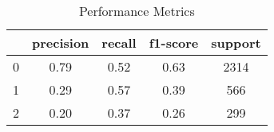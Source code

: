 \begin{table}[!ht]
    \centering
    \caption{Performance Metrics}
    \label{Table:performance_metrics}
    \begin{tabular}{|c|c|c|c|c|}
        \hline & precision & recall & f1-score & support\\
        \hline 0 & 0.79 & 0.52 & 0.63 & 2314\\
        \hline 1 & 0.29 & 0.57 & 0.39 & 566\\
        \hline 2 & 0.20 & 0.37 & 0.26 & 299\\
        \hline
    \end{tabular}
\end{table}